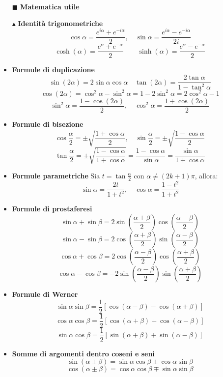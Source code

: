 \documentclass{book}
\newcommand{\g}{\textbf}
\newcommand{\e}{\begin{equation}}
\newcommand{\ex}{\end{equation} }
\renewcommand{\it}{\item[$\cdot$]}
\begin{document}
\begin{multicols}{4}
\begin{itemize}
\item [$\blacksquare$] \g{Matematica utile}
    \item [$\blacktriangle$] \g{Identità trigonometriche}
        \e{\cos\alpha = \frac{e^{i\alpha} + e^{-i\alpha}}{2}, \quad \sin\alpha = \frac{e^{i\alpha} - e^{-i\alpha}}{2i}} \ex
        \e{\cosh(\alpha) = \frac{e^{\alpha} + e^{-\alpha}}{2}\qquad \sinh(\alpha) = \frac{e^{\alpha} - e^{-\alpha}}{2} }\ex

    \it \g{Formule di duplicazione}
        \e{\sin(2\alpha) = 2\sin\alpha\cos\alpha \quad \tan(2\alpha) = \frac{2\tan\alpha}{1 - \tan^2\alpha}} \ex
        \e{\cos(2\alpha) = \cos^2\alpha - \sin^2\alpha = 1 - 2\sin^2\alpha = 2\cos^2\alpha - 1} \ex
        \e{\sin^2\alpha = \frac{1 - \cos(2\alpha)}{2}, \quad \cos^2\alpha = \frac{1 + \cos(2\alpha)}{2}} \ex

    \it \g{Formule di bisezione}
        \e{\cos\frac{\alpha}{2} = \pm\sqrt{\frac{1 + \cos\alpha}{2}}, \quad \sin\frac{\alpha}{2} = \pm\sqrt{\frac{1 - \cos\alpha}{2}}} \ex
        \e{\tan\frac{\alpha}{2} = \pm\sqrt{\frac{1 - \cos\alpha}{1 + \cos\alpha}} = \frac{1-\cos\alpha}{\sin\alpha}=\frac{\sin\alpha}{1+\cos\alpha}} \ex

    \it \g{Formule parametriche}
        Sia $t = \tan\frac{\alpha}{2}$ con $\alpha \neq (2k + 1)\pi$, allora:
        \e{\sin\alpha = \frac{2t}{1 + t^2}, \quad \cos\alpha = \frac{1 - t^2}{1 + t^2}} \ex

    \it \g{Formule di prostaferesi}
        \e{\sin\alpha + \sin\beta = 2\sin\left(\frac{\alpha + \beta}{2}\right)\cos\left(\frac{\alpha - \beta}{2}\right)} \ex
        \e{\sin\alpha - \sin\beta = 2\cos\left(\frac{\alpha + \beta}{2}\right)\sin\left(\frac{\alpha - \beta}{2}\right)} \ex
        \e{\cos\alpha + \cos\beta = 2\cos\left(\frac{\alpha - \beta}{2}\right)\cos\left(\frac{\alpha + \beta}{2}\right)} \ex
        \e{\cos\alpha - \cos\beta = -2\sin\left(\frac{\alpha - \beta}{2}\right)\sin\left(\frac{\alpha + \beta}{2}\right)} \ex

    \it \g{Formule di Werner}
        \e{\sin\alpha\sin\beta = \frac{1}{2}[\cos(\alpha - \beta) - \cos(\alpha + \beta)]} \ex
        \e{\cos\alpha\cos\beta = \frac{1}{2}[\cos(\alpha + \beta) + \cos(\alpha - \beta)]} \ex
        \e{\sin\alpha\cos\beta = \frac{1}{2}[\sin(\alpha + \beta) + \sin(\alpha - \beta)]} \ex
    \it \g{Somme di argomenti dentro coseni e seni}
     \e{\sin(\alpha\pm\beta)=\sin\alpha\cos\beta\pm\cos\alpha\sin\beta}\ex
        \e{\cos(\alpha\pm\beta)=\cos\alpha\cos\beta\mp\sin\alpha\sin\beta}\ex
        

\end{itemize}
\end{multicols}
\end{document}
